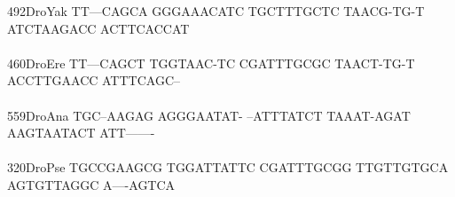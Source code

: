 \documentclass[11pt,twoside,reqno,a4paper]{article}
\begin{document}
{492\hspace*{2\charwidth}DroYak	TT---CAGCA	GGGAAACATC	TGCTTTGCTC	TAACG-TG-T	ATCTAAGACC	ACTTCACCAT	\\
\hspace*{5\charwidth}\hspace*{7\charwidth}\hspace*{1\charwidth}\hspace*{1\charwidth}\hspace*{1\charwidth}\hspace*{1\charwidth}\hspace*{1\charwidth}\hspace*{1\charwidth}\\
460\hspace*{2\charwidth}DroEre	TT---CAGCT	TGGTAAC-TC	CGATTTGCGC	TAACT-TG-T	ACCTTGAACC	ATTTCAGC--	\\
\hspace*{5\charwidth}\hspace*{7\charwidth}\hspace*{1\charwidth}\hspace*{1\charwidth}\hspace*{1\charwidth}\hspace*{1\charwidth}\hspace*{1\charwidth}\hspace*{1\charwidth}\\
559\hspace*{2\charwidth}DroAna	TGC--AAGAG	AGGGAATAT-	--ATTTATCT	TAAAT-AGAT	AAGTAATACT	ATT-------	\\
\hspace*{5\charwidth}\hspace*{7\charwidth}\hspace*{1\charwidth}\hspace*{1\charwidth}\hspace*{1\charwidth}\hspace*{1\charwidth}\hspace*{1\charwidth}\hspace*{1\charwidth}\\
320\hspace*{2\charwidth}DroPse	TGCCGAAGCG	TGGATTATTC	CGATTTGCGG	TTGTTGTGCA	AGTGTTAGGC	A----AGTCA	\\
\hspace*{5\charwidth}\hspace*{7\charwidth}\hspace*{1\charwidth}\hspace*{1\charwidth}\hspace*{1\charwidth}\hspace*{1\charwidth}\hspace*{1\charwidth}\hspace*{1\charwidth}\\
}
\end{document}
